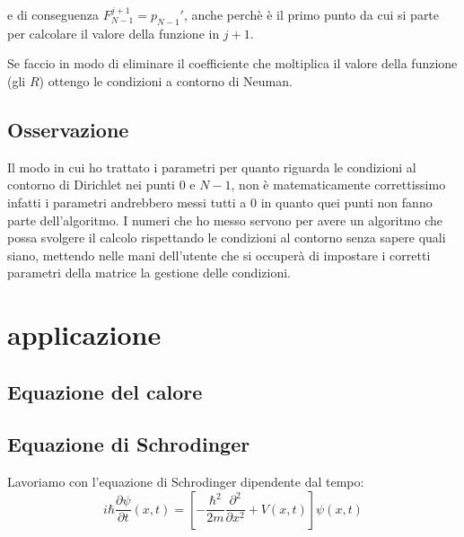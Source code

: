 \documentclass[]{article}
\newcommand{\pde}[2]{\ensuremath{\frac{\partial #1}{\partial #2}}}
\newcommand{\lr}[3]{\ensuremath{\left#1 #3 \right#2}}
\newcommand{\lrq}[1]{\lr{[}{]}{#1}}
\numberwithin{equation}{subsection}
\begin{document}
e di conseguenza $F_{N-1}^{j+1} = p_{N-1}'$, anche perch\`e \`e il primo punto da cui si parte per calcolare il valore della funzione in $j+1$.

Se faccio in modo di eliminare il coefficiente che moltiplica il valore della funzione (gli $R$) ottengo le condizioni a  contorno di Neuman.
\subsection{Osservazione}
Il modo in cui ho trattato i parametri per quanto riguarda le condizioni al contorno di Dirichlet nei punti $0$ e $N-1$, non \`e matematicamente correttissimo infatti i parametri andrebbero messi tutti a 0 in quanto quei punti non fanno parte dell'algoritmo. I numeri che ho messo servono per avere un algoritmo che possa svolgere il calcolo rispettando le condizioni al contorno senza sapere quali siano, mettendo nelle mani dell'utente che si occuper\`a di impostare i corretti parametri della matrice la gestione delle condizioni.
\section{applicazione}
\subsection{Equazione del calore}
\subsection{Equazione di Schrodinger}
Lavoriamo con l'equazione di Schrodinger dipendente dal tempo:
$$i\hbar\pde \psi t(x,t) =\lrq{-\frac{\hbar^2}{2m}\pde{^2}{x^2}+V(x,t)} \psi(x,t)$$
\end{document}
